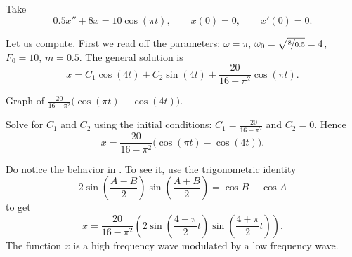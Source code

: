 \begin{example}
Take
\begin{equation*}
0.5 x'' + 8 x = 10 \cos (\pi t), \qquad x(0)=0, \qquad x'(0)=0 .
\end{equation*}

Let us compute.  First we read off the parameters:
$\omega = \pi$, $\omega_0 = \sqrt{\nicefrac{8}{0.5}} = 4$, $F_0 = 10$,
$m=0.5$.  The general solution is
\begin{equation*}
x = C_1 \cos (4 t) + C_2 \sin (4 t) +
\frac{20}{16 - \pi^2} \cos (\pi t) .
\end{equation*}

\begin{mywrapfig}[15]{3.25in}
\capstart
{}
\caption{Graph of
$\frac{20}{16 - \pi^2} \bigl( \cos (\pi t)- \cos (4 t) \bigr)$.\label{3.6:beatingfig}}
\end{mywrapfig}
%
%


Solve for $C_1$ and $C_2$ using the initial conditions:
$C_1 = \frac{-20}{16 - \pi^2}$ and $C_2 = 0$.  Hence
\begin{equation*}
x = 
\frac{20}{16 - \pi^2} \bigl( \cos (\pi t)- \cos (4 t) \bigr) .
\end{equation*}


Do notice the  behavior
in .  To see it,
use the 
trigonometric identity
\begin{equation*}
2\sin \left( \frac{A-B}{2} \right) \sin \left( \frac{A+B}{2} \right) =
\cos B -\cos A 
\end{equation*}
to get 
\begin{equation*}
x = 
\frac{20}{16 - \pi^2} \left( 2 \sin \left(\frac{4-\pi}{2} t \right)
\sin \left( \frac{4+\pi}{2} t \right) \right) .
\end{equation*}
The function $x$ is a high frequency wave modulated by a low frequency
wave.
\end{example}

